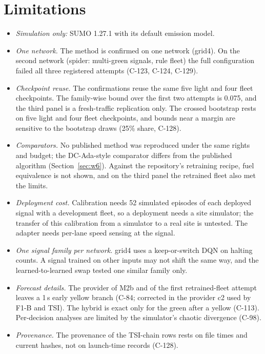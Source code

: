 \documentclass[11pt]{article}
\begin{document}
\section{Limitations}\label{sec:limits}
\begin{itemize}\setlength\itemsep{1pt}
\item \emph{Simulation only:} SUMO 1.27.1 with its default emission model.
\item \emph{One network.} The method is confirmed on one network (grid4). On the second network (spider: multi-green signals, rule fleet)
the full configuration failed all three registered attempts (C-123, C-124, C-129).
\item \emph{Checkpoint reuse.} The confirmations reuse the same five light and four fleet checkpoints. The family-wise bound over the
first two attempts is 0.075, and the third panel is a fresh-traffic replication only. The crossed bootstrap rests on five light and four
fleet checkpoints, and bounds near a margin are sensitive to the bootstrap draws (25\% share, C-128).
\item \emph{Comparators.} No published method was reproduced under the same rights and budget; the DC-Ada-style comparator differs from
the published algorithm (Section~\ref{sec:w6}). Against the repository's retraining recipe, fuel equivalence is not shown, and on the
third panel the retrained fleet also met the limits.
\item \emph{Deployment cost.} Calibration needs 52 simulated episodes of each deployed signal with a development fleet, so a deployment
needs a site simulator; the transfer of this calibration from a simulator to a real site is untested. The adapter needs per-lane speed
sensing at the signal.
\item \emph{One signal family per network.} grid4 uses a keep-or-switch DQN on halting counts. A signal trained on other inputs may not
shift the same way, and the learned-to-learned swap tested one similar family only.
\item \emph{Forecast details.} The provider of M2b and of the first retrained-fleet attempt leaves a 1\,s early yellow branch (C-84;
corrected in the provider c2 used by F1-B and TSI). The hybrid is exact only for the green after a yellow (C-113). Per-decision analyses are
limited by the simulator's chaotic divergence (C-98).
\item \emph{Provenance.} The provenance of the TSI-chain rows rests on file times and current hashes, not on launch-time records (C-128).
\end{itemize}
\end{document}
